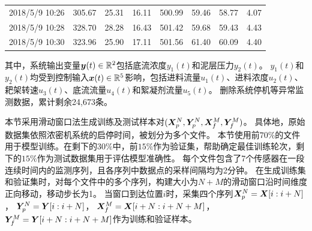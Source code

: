 \begin{table}[ht]
{\begin{tabular}{cccccccc}
2018/5/9 10:26 & 305.67                                                    & 25.31                                                         & 16.11                                                   & 500.99                                                                                                                                                  & 59.46                                                     & 58.77                                   &4.07                          \\
2018/5/9 10:28 & 328.70                                                    & 28.28                                                         & 16.43                                                   & 501.42                                                                                                                                                  & 59.68                                                     & 59.43                                   &4.43                          \\
2018/5/9 10:30 & 323.96                                                    & 25.90                                                         & 17.11                                                   & 501.56                                                                                                                                                  & 61.40                                                     & 60.09                                   &4.40                          \\
\bottomrule
\end{tabular}}
\end{table}

其中，系统输出变量$\boldsymbol y(t) \in \mathbb{R}^2$包括底流浓度$y_1(t)$和泥层压力$y_2(t)$。
$y_1(t)$和$y_2(t)$均受到控制输入$\boldsymbol x(t)\in \mathbb{R}^5$影响，包括进料流量$u_1(t)$、进料浓度$u_2(t)$、耙架转速$u_3(t)$、底流流量$u_4(t)$和絮凝剂流量$u_5(t)$。
删除系统停机等异常监测数据，累计剩余24,673条。

本节采用滑动窗口法生成训练及测试样本对$(\boldsymbol X _p^N, \boldsymbol Y _p^N, \boldsymbol X _f^M, \boldsymbol Y _f^M)$。
具体地，原始数据集依照浓密机系统的启停时间，被划分为多个文件。
本节使用前$70\%$的文件用于模型训练。在剩下的$30\%$中，前$15\%$作为验证集，帮助确定最佳训练轮次，剩下的$15\%$作为测试数据集用于评估模型准确性。
每个文件包含了7个传感器在一段连续时间内的监测序列，且各序列中数据点的采样间隔均为2分钟。
在生成训练集和验证集时，对每个文件中的多个序列，构建大小为$N+M$的滑动窗口沿时间维度正向移动，移动步长为1。
当窗口到达位置$i$时，采集四个序列$\boldsymbol X _p^N =\boldsymbol X[i:i+N]$， $\boldsymbol Y _p^N =\boldsymbol Y[i:i+N]$， $\boldsymbol X _f^M=\boldsymbol X[i+N:i+N+M]$， $\boldsymbol Y _f^M=\boldsymbol Y[i+N:i+N+M]$作为训练和验证样本。

